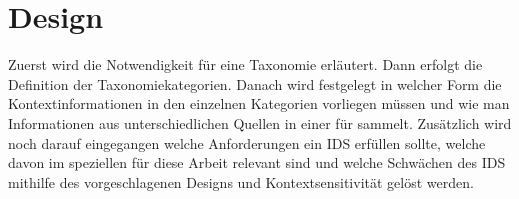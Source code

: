 \chapter{Design}%
\label{cha:design}

Zuerst wird die Notwendigkeit für eine Taxonomie erläutert. Dann erfolgt die Definition der Taxonomiekategorien. Danach wird festgelegt in welcher Form die Kontextinformationen in den einzelnen Kategorien vorliegen müssen und wie man Informationen aus unterschiedlichen Quellen in einer für sammelt. Zusätzlich wird noch darauf eingegangen welche Anforderungen ein IDS erfüllen sollte, welche davon im speziellen für diese Arbeit relevant sind und welche Schwächen des IDS mithilfe des vorgeschlagenen Designs und Kontextsensitivität gelöst werden. 

